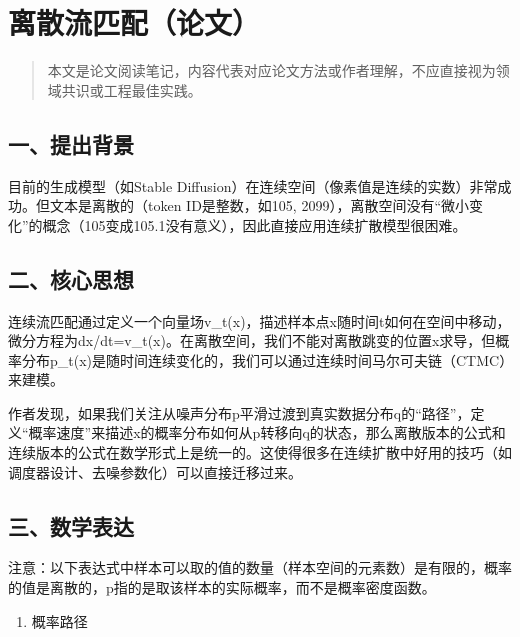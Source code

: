 \clearpage

\hypertarget{ux79bbux6563ux6d41ux5339ux914dux8bbaux6587}{%
\section{离散流匹配（论文）}\label{ux79bbux6563ux6d41ux5339ux914dux8bbaux6587}}

\begin{quote}
本文是论文阅读笔记，内容代表对应论文方法或作者理解，不应直接视为领域共识或工程最佳实践。
\end{quote}

\hypertarget{ux4e00ux63d0ux51faux80ccux666f-6}{%
\subsection{一、提出背景}\label{ux4e00ux63d0ux51faux80ccux666f-6}}

目前的生成模型（如Stable Diffusion）在连续空间（像素值是连续的实数）非常成功。但文本是离散的（token ID是整数，如105, 2099），离散空间没有``微小变化''的概念（105变成105.1没有意义），因此直接应用连续扩散模型很困难。

\hypertarget{ux4e8cux6838ux5fc3ux601dux60f3-4}{%
\subsection{二、核心思想}\label{ux4e8cux6838ux5fc3ux601dux60f3-4}}

连续流匹配通过定义一个向量场v\_t(x)，描述样本点x随时间t如何在空间中移动，微分方程为dx/dt=v\_t(x)。在离散空间，我们不能对离散跳变的位置x求导，但概率分布p\_t(x)是随时间连续变化的，我们可以通过连续时间马尔可夫链（CTMC）来建模。

作者发现，如果我们关注从噪声分布p平滑过渡到真实数据分布q的``路径''，定义``概率速度''来描述x的概率分布如何从p转移向q的状态，那么离散版本的公式和连续版本的公式在数学形式上是统一的。这使得很多在连续扩散中好用的技巧（如调度器设计、去噪参数化）可以直接迁移过来。

\hypertarget{ux4e09ux6570ux5b66ux8868ux8fbe-3}{%
\subsection{三、数学表达}\label{ux4e09ux6570ux5b66ux8868ux8fbe-3}}

注意：以下表达式中样本可以取的值的数量（样本空间的元素数）是有限的，概率的值是离散的，p指的是取该样本的实际概率，而不是概率密度函数。

\begin{enumerate}
\def\labelenumi{\arabic{enumi}.}
\tightlist
\item
  概率路径
\end{enumerate}

